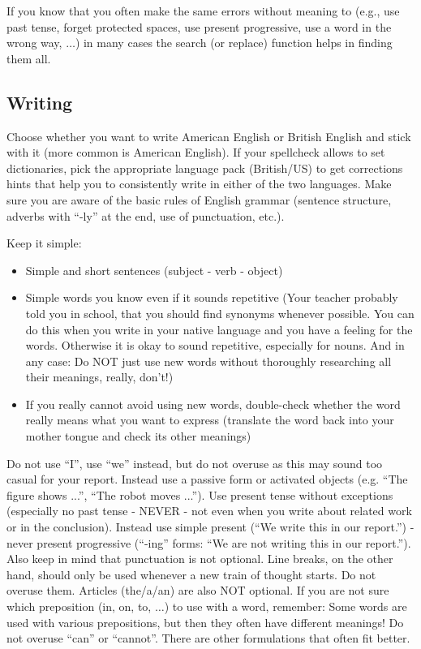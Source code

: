 If you know that you often make the same errors without meaning to (e.g., use past tense, forget protected spaces, use present progressive, use a word in the wrong way, $\ldots$) in many cases the search (or replace) function helps in finding them all.

\subsection{Writing}

Choose whether you want to write American English or British English and stick with it (more common is American English). If your spellcheck allows to set dictionaries, pick the appropriate language pack (British/US) to get corrections hints that help you to consistently write in either of the two languages.
Make sure you are aware of the basic rules of English grammar (sentence structure, adverbs with ``-ly'' at the end, use of punctuation, etc.).

Keep it simple: 

\begin{itemize}
	\item Simple and short sentences (subject - verb - object)
	\item Simple words you know even if it sounds repetitive (Your teacher probably told you in school, that you should find synonyms whenever possible. You can do this when you write in your native language and you have a feeling for the words. Otherwise it is okay to sound repetitive, especially for nouns. And in any case: Do NOT just use new words without thoroughly researching all their meanings, really, don't!)
	\item If you really cannot avoid using new words, double-check whether the word really means what you want to express (translate the word back into your mother tongue and check its other meanings)
\end{itemize}

Do not use ``I'', use ``we'' instead, but do not overuse as this may sound too casual for your report. Instead use a passive form or activated objects (e.g. ``The figure shows ...'', ``The robot moves ...''). Use present tense without exceptions (especially no past tense - NEVER - not even when you write about related work or in the conclusion). Instead use simple present (``We write this in our report.'') - never present progressive (``-ing'' forms: ``We are not writing this in our report.''). Also keep in mind that punctuation is not optional. Line breaks, on the other hand, should only be used whenever a new train of thought starts. Do not overuse them. Articles (the/a/an) are also NOT optional. If you are not sure which preposition (in, on, to, $\ldots$) to use with a word, remember: Some words are used with various prepositions, but then they often have different meanings! Do not overuse ``can'' or ``cannot''. There are other formulations that often fit better.

